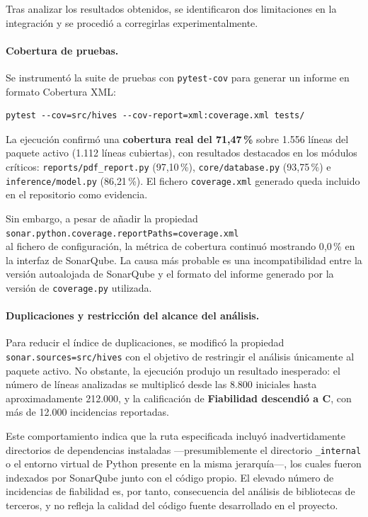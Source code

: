 Tras analizar los resultados obtenidos, se identificaron dos limitaciones en la
integración y se procedió a corregirlas experimentalmente.

\paragraph{Cobertura de pruebas.}
Se instrumentó la suite de pruebas con \texttt{pytest-cov} para generar un
informe en formato Cobertura XML:

\begin{verbatim}
pytest --cov=src/hives --cov-report=xml:coverage.xml tests/
\end{verbatim}

La ejecución confirmó una \textbf{cobertura real del 71{,}47\,\%} sobre 1.556
líneas del paquete activo (1.112 líneas cubiertas), con resultados destacados
en los módulos críticos: \texttt{reports/pdf\_report.py} (97{,}10\,\%),
\texttt{core/database.py} (93{,}75\,\%) e \texttt{inference/model.py}
(86{,}21\,\%). El fichero \texttt{coverage.xml} generado queda incluido en el
repositorio como evidencia.

Sin embargo, a pesar de añadir la propiedad \\
\texttt{sonar.python.coverage.reportPaths=coverage.xml} \\ al fichero de
configuración, la métrica de cobertura continuó mostrando 0{,}0\,\% en la
interfaz de SonarQube. La causa más probable es una incompatibilidad entre la
versión autoalojada de SonarQube y el formato del informe generado por la
versión de \texttt{coverage.py} utilizada.

\paragraph{Duplicaciones y restricción del alcance del análisis.}
Para reducir el índice de duplicaciones, se modificó la propiedad
\texttt{sonar.sources=src/hives} con el objetivo de restringir el análisis
únicamente al paquete activo. No obstante, la ejecución produjo un resultado
inesperado: el número de líneas analizadas se multiplicó desde las 8.800
iniciales hasta aproximadamente 212.000, y la calificación de
\textbf{Fiabilidad descendió a C}, con más de 12.000 incidencias reportadas.

Este comportamiento indica que la ruta especificada incluyó inadvertidamente
directorios de dependencias instaladas —presumiblemente el directorio
\texttt{\_internal} o el entorno virtual de Python presente en la misma
jerarquía—, los cuales fueron indexados por SonarQube junto con el código
propio. El elevado número de incidencias de fiabilidad es, por tanto,
consecuencia del análisis de bibliotecas de terceros, y no refleja la calidad
del código fuente desarrollado en el proyecto.

